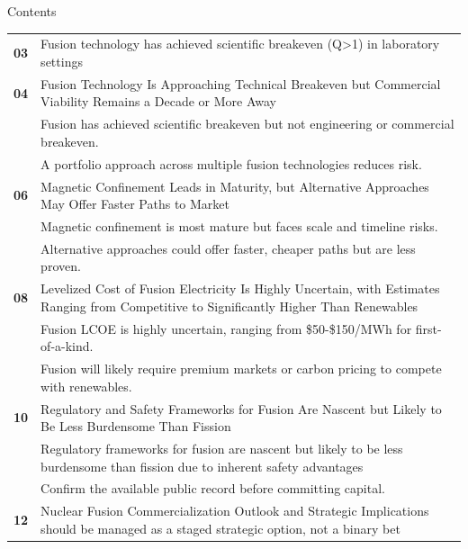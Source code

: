 \documentclass[10pt,a4paper]{article}
\begin{document}
\clearpage
{\sffamily\fontsize{26}{31}\selectfont\color{BONavy} Contents}\par\vspace{10pt}
\begin{tabularx}{\linewidth}{p{14mm}Y}
\textcolor{BOGreen}{\bfseries 03} & Fusion technology has achieved scientific breakeven (Q>1) in laboratory settings \\[7pt]
\textcolor{BOGreen}{\bfseries 04} & Fusion Technology Is Approaching Technical Breakeven but Commercial Viability Remains a Decade or More Away \\[5pt]
 & {\scriptsize\color{BOMuted} Fusion has achieved scientific breakeven but not engineering or commercial breakeven.} \\[1pt]
 & {\scriptsize\color{BOMuted} A portfolio approach across multiple fusion technologies reduces risk.} \\[1pt]
\textcolor{BOGreen}{\bfseries 06} & Magnetic Confinement Leads in Maturity, but Alternative Approaches May Offer Faster Paths to Market \\[5pt]
 & {\scriptsize\color{BOMuted} Magnetic confinement is most mature but faces scale and timeline risks.} \\[1pt]
 & {\scriptsize\color{BOMuted} Alternative approaches could offer faster, cheaper paths but are less proven.} \\[1pt]
\textcolor{BOGreen}{\bfseries 08} & Levelized Cost of Fusion Electricity Is Highly Uncertain, with Estimates Ranging from Competitive to Significantly Higher Than Renewables \\[5pt]
 & {\scriptsize\color{BOMuted} Fusion LCOE is highly uncertain, ranging from \$50-\$150/MWh for first-of-a-kind.} \\[1pt]
 & {\scriptsize\color{BOMuted} Fusion will likely require premium markets or carbon pricing to compete with renewables.} \\[1pt]
\textcolor{BOGreen}{\bfseries 10} & Regulatory and Safety Frameworks for Fusion Are Nascent but Likely to Be Less Burdensome Than Fission \\[5pt]
 & {\scriptsize\color{BOMuted} Regulatory frameworks for fusion are nascent but likely to be less burdensome than fission due to inherent safety advantages} \\[1pt]
 & {\scriptsize\color{BOMuted} Confirm the available public record before committing capital.} \\[1pt]
\textcolor{BOGreen}{\bfseries 12} & Nuclear Fusion Commercialization Outlook and Strategic Implications should be managed as a staged strategic option, not a binary bet \\[5pt]

\end{tabularx}
\end{document}
